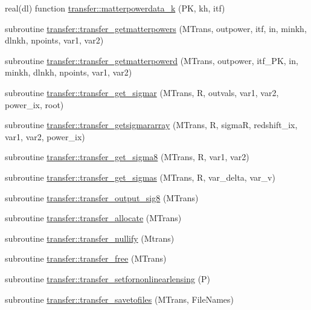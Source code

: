 \begin{DoxyCompactItemize}
\item 
real(dl) function \mbox{\hyperlink{namespacetransfer_a7d7e2b6a55941b8e40b01b2cfed0af02}{transfer\+::matterpowerdata\+\_\+k}} (PK, kh, itf)
\item 
subroutine \mbox{\hyperlink{namespacetransfer_a4515b492b259544eae13a774663d6cea}{transfer\+::transfer\+\_\+getmatterpowers}} (M\+Trans, outpower, itf, in, minkh, dlnkh, npoints, var1, var2)
\item 
subroutine \mbox{\hyperlink{namespacetransfer_aec77f610696b7445e8c8e070491ca238}{transfer\+::transfer\+\_\+getmatterpowerd}} (M\+Trans, outpower, itf\+\_\+\+PK, in, minkh, dlnkh, npoints, var1, var2)
\item 
subroutine \mbox{\hyperlink{namespacetransfer_a0b068265a029b16713e45ff26d8e6794}{transfer\+::transfer\+\_\+get\+\_\+sigmar}} (M\+Trans, R, outvals, var1, var2, power\+\_\+ix, root)
\item 
subroutine \mbox{\hyperlink{namespacetransfer_a9f16a04226ffcb97b7f2bfc5b681f3b4}{transfer\+::transfer\+\_\+getsigmararray}} (M\+Trans, R, sigmaR, redshift\+\_\+ix, var1, var2, power\+\_\+ix)
\item 
subroutine \mbox{\hyperlink{namespacetransfer_a6330289a440bd51a5c55da9c40dee8a2}{transfer\+::transfer\+\_\+get\+\_\+sigma8}} (M\+Trans, R, var1, var2)
\item 
subroutine \mbox{\hyperlink{namespacetransfer_a94b4673ba4b74ac5aef785afde714446}{transfer\+::transfer\+\_\+get\+\_\+sigmas}} (M\+Trans, R, var\+\_\+delta, var\+\_\+v)
\item 
subroutine \mbox{\hyperlink{namespacetransfer_a7f7da292010e79184bed8cdb24e03d2b}{transfer\+::transfer\+\_\+output\+\_\+sig8}} (M\+Trans)
\item 
subroutine \mbox{\hyperlink{namespacetransfer_a687f977819e9abe471f86cff900939e7}{transfer\+::transfer\+\_\+allocate}} (M\+Trans)
\item 
subroutine \mbox{\hyperlink{namespacetransfer_a0e02ff3d1ba9dd5ad8c5dcaf76987ecc}{transfer\+::transfer\+\_\+nullify}} (Mtrans)
\item 
subroutine \mbox{\hyperlink{namespacetransfer_a34407967277591afeb26880a4f0926dc}{transfer\+::transfer\+\_\+free}} (M\+Trans)
\item 
subroutine \mbox{\hyperlink{namespacetransfer_ad877dbf164ab7d108432f41d21c155fd}{transfer\+::transfer\+\_\+setfornonlinearlensing}} (P)
\item 
subroutine \mbox{\hyperlink{namespacetransfer_adc67bad9d6015b3ecd203551b927d522}{transfer\+::transfer\+\_\+savetofiles}} (M\+Trans, File\+Names)

\end{DoxyCompactItemize}
